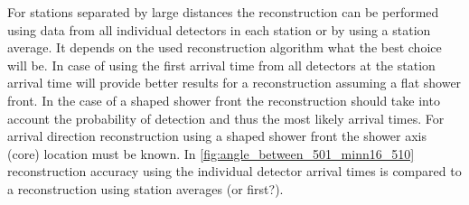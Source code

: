 For stations separated by large distances the reconstruction can be performed using data from all individual detectors in each station or by using a station average. It depends on the used reconstruction algorithm what the best choice will be. In case of using the first arrival time from all detectors at the station arrival time will provide better results for a reconstruction assuming a flat shower front. In the case of a shaped shower front the reconstruction should take into account the probability of detection and thus the most likely arrival times. For arrival direction reconstruction using a shaped shower front the shower axis (core) location must be known. In \cref{fig:angle_between_501_minn16_510} reconstruction accuracy using the individual detector arrival times is compared to a reconstruction using station averages (or first?).
%
%
%
